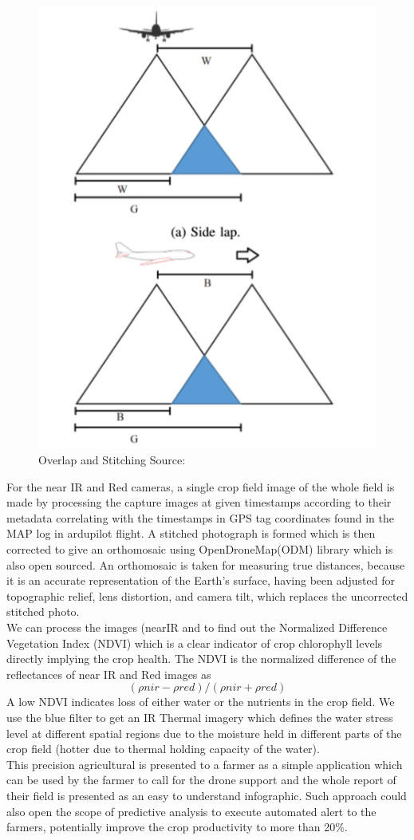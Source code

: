 \begin{figure}[H]
    \centering
    \includegraphics[width=0.7\linewidth]{SummerInterReport/project/Images-Major/overlap.png}
    \caption{Overlap and Stitching Source: \cite{one}}
    \label{fig:compEy}
\end{figure}

For the near IR and Red cameras, a single crop field image of the whole field is made by processing the capture images at given timestamps according to their metadata correlating with the timestamps in GPS tag coordinates found in the MAP log in ardupilot flight. A stitched photograph is formed which is then corrected to give an orthomosaic using OpenDroneMap(ODM) library which is also open sourced. An orthomosaic is taken for measuring true distances, because it is an accurate representation of the Earth's surface, having been adjusted for topographic relief, lens distortion, and camera tilt, which replaces the uncorrected stitched photo.\\
We can process the images (nearIR and  to find out the Normalized Difference Vegetation Index (NDVI) which is a clear indicator of crop chlorophyll levels directly implying the crop health. The NDVI is the normalized difference of the reflectances of near IR and Red images as 
\begin{equation}
    (\rho nir −\rho red) / (\rho nir + \rho red)
\end{equation} A low NDVI indicates loss of either water or the nutrients in the crop field. We use the blue filter to get an IR Thermal imagery which defines the water stress level at different spatial regions due to the moisture held in different parts of the crop field (hotter due to thermal holding capacity of the water).
\\
This precision agricultural is presented to a farmer as a simple application which can be used by the farmer to call for the drone support and the whole report of their field is presented as an easy to understand infographic. Such approach could also open the scope of predictive analysis to execute automated alert to the farmers, potentially improve the crop productivity to more than 20\%.


